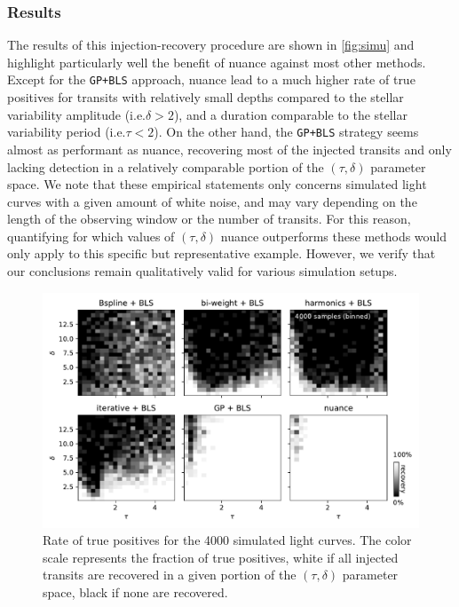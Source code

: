 \documentclass[modern]{aastex631}
\newcommand{\nuancecode}{\textsf{nuance}}
\begin{document}
\subsubsection*{Results}
The results of this injection-recovery procedure are shown in \autoref{fig:simu} and highlight particularly well the benefit of \textsf{nuance} against most other methods. Except for the \texttt{GP+BLS} approach, \nuancecode{} lead to a much higher rate of true positives for transits with relatively small depths compared to the stellar variability amplitude (i.e.\;$\delta>2$), and a duration comparable to the stellar variability period (i.e.\;$\tau<2$). On the other hand, the \texttt{GP+BLS} strategy seems almost as performant as \nuancecode, recovering most of the injected transits and only lacking detection in a relatively comparable portion of the $(\tau, \delta)$ parameter space. We note that these empirical statements only concerns simulated light curves with a given amount of white noise, and may vary depending on the length of the observing window or the number of transits. For this reason, quantifying for which values of $(\tau, \delta)$ \textsf{nuance} outperforms these methods would only apply to this specific but representative example. However, we verify that our conclusions remain qualitatively valid for various simulation setups.
\begin{figure}[H]
    \begin{centering}
        \includegraphics[width=\linewidth]{../workflows/synthetic-injection-recovery/figures/synthetic_ir.pdf}
        \caption{Rate of true positives for the 4000 simulated light curves. The color scale represents the fraction of true positives, white if all injected transits are recovered in a given portion of the $(\tau, \delta)$ parameter space, black if none are recovered.}
        \label{fig:simu}
    \end{centering}
\end{figure}
\end{document}
